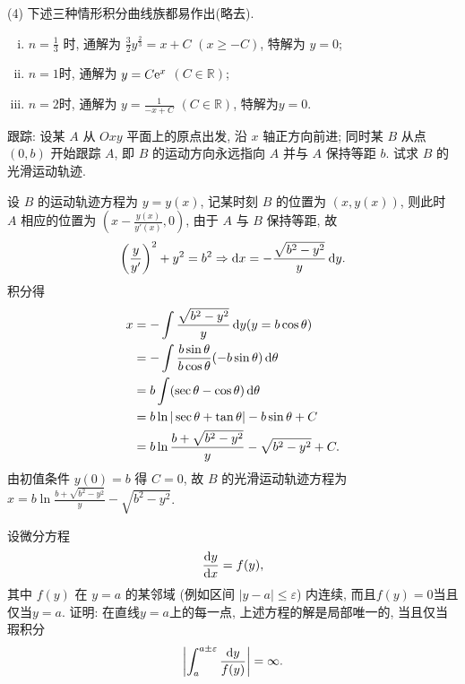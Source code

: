 \begin{solve}
  (4) 下述三种情形积分曲线族都易作出(略去).
  \begin{enumerate}[(i)]
  \item $n=\frac{1}{3}$ 时, 通解为 $\frac{3}{2}y^{\frac{2}{3}}=x+C$ $(x\geq-C)$, 特解为 $y=0$;
  \item $n=1$时, 通解为 $y=C\mathrm{e}^x$ $(C\in\mathbb{R})$;
  \item $n=2$时, 通解为 $y=\frac{1}{-x+C}$ $(C\in\mathbb{R})$, 特解为$y=0$.
  \end{enumerate}
\end{solve}



\begin{exercise}
  跟踪: 设某 $A$ 从 $Oxy$ 平面上的原点出发, 沿 $x$ 轴正方向前进; 同时某 $B$ 从点 $(0,b)$ 开始跟踪 $A$, 
  即 $B$ 的运动方向永远指向 $A$ 并与 $A$ 保持等距 $b$. 试求 $B$ 的光滑运动轨迹.
\end{exercise}

\begin{solve}
  设 $B$ 的运动轨迹方程为 $y=y(x)$, 记某时刻 $B$ 的位置为 $(x,y(x))$, 
  则此时 $A$ 相应的位置为 $\left(x-\frac{y(x)}{y'(x)},0\right)$, 由于 $A$ 与 $B$ 保持等距, 故
  \[\left(\frac{y}{y'}\right)^2+y^2=b^2\Rightarrow\mathop{}\!\mathrm{d} x=-\frac{\sqrt{b^2-y^2}}{y}\mathop{}\!\mathrm{d} y.\]
  积分得
  \[\begin{split}
  x
  & = -\int\frac{\sqrt{b^2-y^2}}{y}\mathop{}\!\mathrm{d} y(y=b\cos\theta) \\
  & = -\int\frac{b\sin\theta}{b\cos\theta}(-b\sin\theta)\mathop{}\!\mathrm{d}\theta \\
  & = b\int(\sec\theta-\cos\theta)\mathop{}\!\mathrm{d}\theta \\
  & = b\ln|\sec\theta+\tan\theta|-b\sin\theta+C \\
  & = b\ln\frac{b+\sqrt{b^2-y^2}}{y}-\sqrt{b^2-y^2}+C.
  \end{split}\]
  由初值条件 $y(0)=b$ 得 $C=0$, 故 $B$ 的光滑运动轨迹方程为
  $x=b\ln\frac{b+\sqrt{b^2-y^2}}{y}-\sqrt{b^2-y^2}$.
\end{solve}



\begin{exercise}
  设微分方程
  \[\frac{\mathop{}\!\mathrm{d} y}{\mathop{}\!\mathrm{d} x}=f(y),\]
  其中 $f(y)$ 在 $y=a$ 的某邻域 (例如区间 $|y-a|\leq\varepsilon$) 内连续, 而且$f(y)=0$当且仅当$y=a$. 
  证明: 在直线$y=a$上的每一点, 上述方程的解是局部唯一的, 当且仅当瑕积分
  \[\left|\int_a^{a\pm\varepsilon}\frac{\mathop{}\!\mathrm{d} y}{f(y)}\right|=\infty.\]
\end{exercise}

